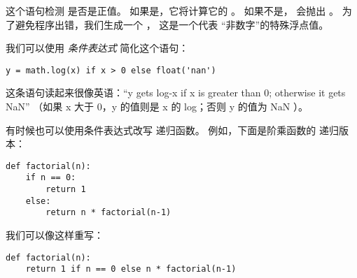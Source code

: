 
这个语句检测  是否是正值。
如果是，它将计算它的 。
如果不是，  会抛出 。
为了避免程序出错，我们生成一个 ， 这是一个代表 ``非数字''的特殊浮点值。



我们可以使用 {\em 条件表达式} 简化这个语句：

\begin{lstlisting}
y = math.log(x) if x > 0 else float('nan')
\end{lstlisting}


这条语句读起来很像英语：``y gets log-x if x is
greater than 0; otherwise it gets NaN''
（如果 x 大于 0，y 的值则是 x 的 log；否则 y 的值为 NaN ）。


有时候也可以使用条件表达式改写 递归函数。  例如，下面是阶乘函数的 递归版本：


\begin{lstlisting}
def factorial(n):
    if n == 0:
        return 1
    else:
        return n * factorial(n-1)
\end{lstlisting}


我们可以像这样重写：

\begin{lstlisting}
def factorial(n):
    return 1 if n == 0 else n * factorial(n-1)
\end{lstlisting}


